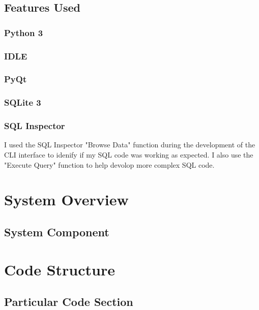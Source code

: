 \subsection{Features Used}
\subsubsection{Python 3}

\subsubsection{IDLE}

\subsubsection{PyQt}

\subsubsection{SQLite 3}

\subsubsection{SQL Inspector}
I used the SQL Inspector "Browse Data" function during the development of the CLI interface to idenify if my SQL code was working as expected. I also use the "Execute Query" function to help devolop more complex SQL code.

\section{System Overview}

\subsection{System Component}

\section{Code Structure}

\subsection{Particular Code Section}
\begin{comment}
\begin{figure}[H]
    \pythonfile[firstline=5,lastline=10]{./tex/function_programs/print_function.py}
    \caption{The print() function} \label{fig:print_function}
\end{figure}
\end{comment}

